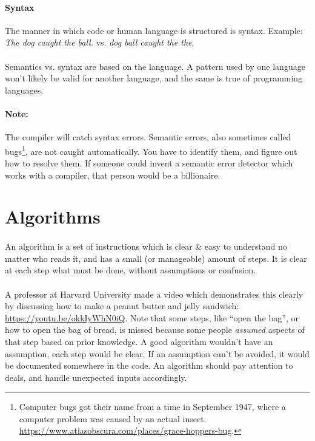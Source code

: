 \documentclass[letter,11pt]{article}
\begin{document}
\paragraph{Syntax} The manner in which code or human language is structured is syntax. Example: \textit{The dog caught the ball.} vs. \textit{dog ball caught the the}.

\paragraph{}Semantics vs. syntax are based on the language. A pattern used by one language won't likely be valid for another language, and the same is true of programming languages.

\paragraph{Note:}The compiler will catch syntax errors. Semantic errors, also sometimes called bugs\footnote{Computer bugs got their name from a time in September 1947, where a computer problem was caused by an actual insect. \url{https://www.atlasobscura.com/places/grace-hoppers-bug}.}, are not caught automatically. You have to identify them, and figure out how to resolve them. If someone could invent a semantic error detector which works with a compiler, that person would be a billionaire.

\section{Algorithms}
\paragraph{}An algorithm is a set of instructions which is clear \& easy to understand no matter who reads it, and has a small (or manageable) amount of steps. It is clear at each step what must be done, without assumptions or confusion.

\paragraph{}A professor at Harvard University made a video which demonstrates this clearly by discussing how to make a peanut butter and jelly sandwich: \url{https://youtu.be/okkIyWhN0iQ}. Note that some steps, like ``open the bag'', or how to open the bag of bread, is missed because some people \textit{assumed} aspects of that step based on prior knowledge. A good algorithm wouldn't have an assumption, each step would be clear. If an assumption can't be avoided, it would be documented somewhere in the code. An algorithm should pay attention to deals, and handle unexpected inputs accordingly.
\end{document}
